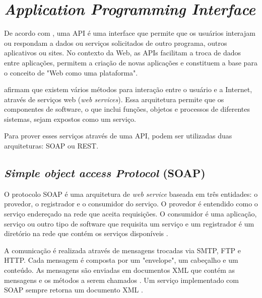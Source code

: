 \chapter{\textit{Application Programming Interface}} \label{cap:api}

De acordo com , uma API é uma interface que permite que os 
usuários interajam ou respondam a dados ou serviços solicitados de outro programa, outros
aplicativos ou sites. No contexto da Web, as APIs facilitam a troca de dados entre 
aplicações, permitem a criação de novas aplicações e constituem a base para o conceito de 
"Web como uma plataforma". 

 afirmam que existem vários métodos para interação entre o  
usuário e a Internet, através de serviços web (\textit{web services}). Essa arquitetura permite que os componentes de software, o que inclui funções, objetos e processos de diferentes sistemas, sejam expostos 
como um serviço.

Para prover esses serviços através de uma API, podem ser utilizadas duas arquiteturas: SOAP ou REST.

\section{\textit{Simple object access Protocol} (SOAP) }

O protocolo SOAP é uma arquitetura de \textit{web service} baseada em três entidades: o provedor, o registrador e o consumidor do serviço. O provedor é entendido como o serviço endereçado na rede
que aceita requisições. O consumidor é uma aplicação, serviço ou outro tipo de software que
requisita um serviço e um registrador é um diretório na rede que contém os serviços disponíveis \cite{mumbaikar}.

A comunicação é realizada através de mensagens trocadas via SMTP, FTP e HTTP. Cada mensagem 
é composta por um "envelope", um cabeçalho e um conteúdo. As mensagens são enviadas em documentos XML
que contém as mensagens e os métodos a serem chamados \cite{mumbaikar}. 
Um serviço implementado com SOAP sempre retorna um documento XML \cite{wagh2012comparative}.




